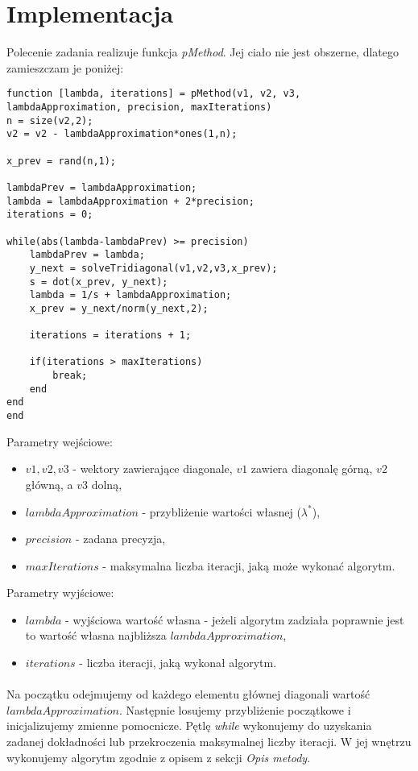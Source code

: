\documentclass{article}
\begin{document}
\section{Implementacja}
Polecenie zadania realizuje funkcja \textit{pMethod}. Jej ciało nie jest obszerne, dlatego zamieszczam je poniżej:
\begin{lstlisting}[style=Matlab-editor]
function [lambda, iterations] = pMethod(v1, v2, v3, lambdaApproximation, precision, maxIterations)
n = size(v2,2);
v2 = v2 - lambdaApproximation*ones(1,n);

x_prev = rand(n,1);

lambdaPrev = lambdaApproximation;
lambda = lambdaApproximation + 2*precision; 
iterations = 0;

while(abs(lambda-lambdaPrev) >= precision)
    lambdaPrev = lambda;
    y_next = solveTridiagonal(v1,v2,v3,x_prev);
    s = dot(x_prev, y_next);
    lambda = 1/s + lambdaApproximation;
    x_prev = y_next/norm(y_next,2);
    
    iterations = iterations + 1;
    
    if(iterations > maxIterations)
        break;
    end
end
end
\end{lstlisting}
\vspace{4pt}
Parametry wejściowe:
\begin{itemize}
\item $v1, v2, v3$ - wektory zawierające diagonale, $v1$ zawiera diagonalę górną, $v2$ główną, a $v3$ dolną,
\item $lambdaApproximation$ - przybliżenie wartości własnej ($\lambda^*$),
\item $precision$ - zadana precyzja,
\item $maxIterations$ - maksymalna liczba iteracji, jaką może wykonać algorytm.
\end{itemize}
Parametry wyjściowe:
\begin{itemize}
\item $lambda$ - wyjściowa wartość własna - jeżeli algorytm zadziała poprawnie jest to wartość własna najbliższa $lambdaApproximation$,
\item $iterations$ - liczba iteracji, jaką wykonał algorytm.
\end{itemize}
\paragraph{}
Na początku odejmujemy od każdego elementu głównej diagonali wartość $lambdaApproximation$. Następnie losujemy przybliżenie początkowe i inicjalizujemy zmienne pomocnicze. Pętlę \textit{while} wykonujemy do uzyskania zadanej dokładności lub przekroczenia maksymalnej liczby iteracji. W jej wnętrzu wykonujemy algorytm zgodnie z opisem z sekcji \textit{Opis metody}.
\end{document}

